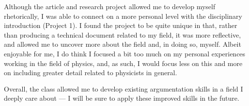 \begin{justify}
  \hspace{.5in} Although the article and research project allowed me to develop myself rhetorically, I was able to connect on a more personal level with the disciplinary introduction (Project 1). I found the project to be quite unique in that, rather than producing a technical document related to my field, it was more reflective, and allowed me to uncover more about the field and, in doing so, myself. Albeit enjoyable for me, I do think I focused a bit too much on my personal experiences working in the field of physics, and, as such, I would focus less on this and more on including greater detail related to physicists in general.

  \hspace{.5in} Overall, the class allowed me to develop existing argumentation skills in a field I deeply care about — I will be sure to apply these improved skills in the future. 

\end{justify} 



